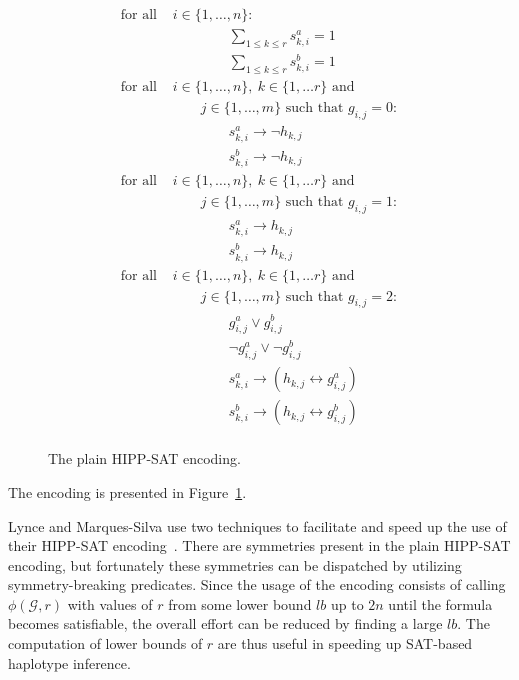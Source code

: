 \documentclass[12pt,a4paper]{article}
\begin{document}
\begin{figure}
\centering
\small
\begin{mdframed}
\begin{align}
\text{for all  }& i\in\{1,\dots , n\}:\nonumber\\
& \quad\quad\quad\quad \sum_{1\leq k \leq r} s^a_{k,i} = 1 \\
& \quad\quad\quad\quad \sum_{1\leq k \leq r} s^b_{k,i} = 1 \\
\text{for all  }& i\in\{1,\dots , n\},\ k\in\{1,\dots r\}\text{ and }\nonumber\\&\quad\quad j\in\{1,\dots ,m\} \text{ such that }g_{i,j}=0:\nonumber\\
& \quad\quad\quad\quad s^a_{k,i}\rightarrow \neg h_{k,j} \\
& \quad\quad\quad\quad s^b_{k,i}\rightarrow \neg h_{k,j} \\
\text{for all  }& i\in\{1,\dots , n\},\ k\in\{1,\dots r\}\text{ and }\nonumber\\&\quad\quad j\in\{1,\dots ,m\} \text{ such that }g_{i,j}=1:\nonumber\\
& \quad\quad\quad\quad s^a_{k,i}\rightarrow h_{k,j} \\
& \quad\quad\quad\quad s^b_{k,i}\rightarrow h_{k,j} \\
\text{for all  }& i\in\{1,\dots , n\},\ k\in\{1,\dots r\}\text{ and }\nonumber\\&\quad\quad j\in\{1,\dots ,m\} \text{ such that }g_{i,j}=2:\nonumber\\
& \quad\quad\quad\quad g^a_{i,j}\vee g^b_{i,j} \\
& \quad\quad\quad\quad \neg g^a_{i,j}\vee \neg g^b_{i,j} \\
& \quad\quad\quad\quad s^a_{k,i}\rightarrow (h_{k,j}\leftrightarrow g^a_{i,j}) \\
& \quad\quad\quad\quad s^b_{k,i}\rightarrow (h_{k,j}\leftrightarrow g^b_{i,j}) \\
\end{align}
\end{mdframed}
\caption{The plain HIPP-SAT encoding.}
\label{fig:enc-hipp-sat}
\end{figure}

The encoding is presented in Figure~\ref{fig:enc-hipp-sat}.


Lynce and Marques-Silva use two techniques to facilitate and speed up the use of their HIPP-SAT encoding~\cite{DBLP:conf/aaai/LynceM06}.
There are symmetries present in the plain HIPP-SAT encoding, but fortunately these symmetries can be dispatched by utilizing symmetry-breaking predicates.
Since the usage of the encoding consists of calling $\phi (\mathcal{G}, r)$ with values of $r$ from some lower bound $lb$ up to $2n$ until the formula becomes satisfiable, the overall effort can be reduced by finding a large $lb$.
The computation of lower bounds of $r$ are thus useful in speeding up SAT-based haplotype inference.
\end{document}
